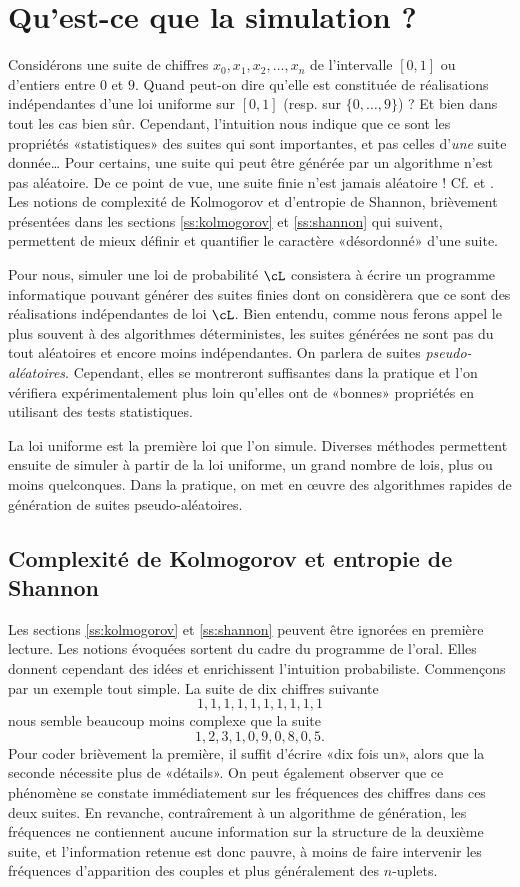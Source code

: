 %
%
\chapter{Qu'est-ce que la simulation ?}
%
%

Considérons une suite de chiffres $x_0,x_1,x_2,\ldots,x_n$ de l'intervalle $[0,1]$
ou d'entiers entre $0$ et $9$. Quand peut-on dire qu'elle est constituée de
réalisations indépendantes d'une loi uniforme sur $[0,1]$ (resp. sur
$\{0,\ldots,9\}$) ? Et bien dans tout les cas bien sûr. Cependant, l'intuition nous
indique que ce sont les propriétés «statistiques» des suites qui sont
importantes, et pas celles d'\emph{une} suite donnée\ldots{} Pour certains, une
suite qui peut être générée par un algorithme n'est pas aléatoire. De ce point
de vue, une suite finie n'est jamais aléatoire ! Cf. \cite[chap. IV, page
73]{bouleau} et \cite{knuth-taocp-2-3}. Les notions de complexité de
Kolmogorov et d'entropie de Shannon, brièvement présentées dans les sections
\ref{ss:kolmogorov} et \ref{ss:shannon} qui suivent, permettent de mieux
définir et quantifier le caractère «désordonné» d'une suite.

Pour nous, simuler une loi de probabilité $\cL$ consistera à écrire un
programme informatique pouvant générer des suites finies dont on considèrera
que ce sont des réalisations indépendantes de loi $\cL$. Bien entendu, comme
nous ferons appel le plus souvent à des algorithmes déterministes, les suites
générées ne sont pas du tout aléatoires et encore moins indépendantes. On
parlera de suites \emph{pseudo-aléatoires}. Cependant, elles se montreront
suffisantes dans la pratique et l'on vérifiera expérimentalement plus loin
qu'elles ont de «bonnes» propriétés en utilisant des tests statistiques.

La loi uniforme est la première loi que l'on simule. Diverses méthodes
permettent ensuite de simuler à partir de la loi uniforme, un grand nombre de
lois, plus ou moins quelconques. Dans la pratique, on met en {\oe}uvre des
algorithmes rapides de génération de suites pseudo-aléatoires.


%
\section{Complexité de Kolmogorov et entropie de Shannon}
%

Les sections \ref{ss:kolmogorov} et \ref{ss:shannon} peuvent être ignorées en
première lecture. Les notions évoquées sortent du cadre du programme de
l'oral. Elles donnent cependant des idées et enrichissent l'intuition
probabiliste. Commençons par un exemple tout simple. La suite de dix chiffres
suivante
$$1,1,1,1,1,1,1,1,1,1$$
nous semble beaucoup moins complexe que la suite
$$1,2,3,1,0,9,0,8,0,5.$$
Pour coder brièvement la première, il suffit d'écrire
«dix fois un», alors que la seconde nécessite plus de «détails». On peut
également observer que ce phénomène se constate immédiatement sur les
fréquences des chiffres dans ces deux suites. En revanche, contraîrement à un
algorithme de génération, les fréquences ne contiennent aucune information sur
la structure de la deuxième suite, et l'information retenue est donc pauvre, à
moins de faire intervenir les fréquences d'apparition des couples et plus
généralement des $n$-uplets.

